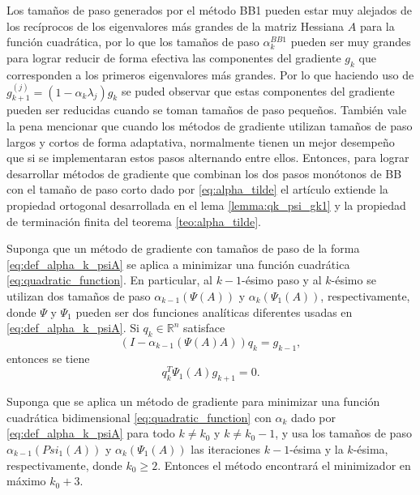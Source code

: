 Los tamaños de paso generados por el método BB1 pueden estar muy alejados de los recíprocos de los eigenvalores más grandes de la matriz Hessiana $A$ para la función cuadrática, por lo que los tamaños de paso $\alpha_k^{BB1}$ pueden ser muy grandes para lograr reducir de forma efectiva las componentes  del gradiente $g_k$ que corresponden a los primeros eigenvalores más grandes. Por lo que haciendo uso de $g_{k+1}^{(j)} = (1-\alpha_k\lambda_j)g_k$ se puded observar que estas componentes del gradiente pueden ser reducidas cuando se toman tamaños de paso pequeños. También vale la pena mencionar que cuando los métodos de gradiente utilizan tamaños de paso largos y cortos de forma adaptativa, normalmente tienen un mejor desempeño que si se implementaran estos pasos alternando entre ellos. Entonces, para lograr desarrollar métodos de gradiente que combinan los dos pasos monótonos de BB con el tamaño de paso corto dado por \ref{eq:alpha_tilde} el artículo extiende la propiedad ortogonal desarrollada en el lema \ref{lemma:qk_psi_gk1} y la propiedad de terminación finita del teorema \ref{teo:alpha_tilde}.

\begin{lema}
    Suponga que un método de gradiente con tamaños de paso de la forma \ref{eq:def_alpha_k_psiA} se aplica a minimizar una función cuadrática \ref{eq:quadratic_function}. En particular, al $k-1$-ésimo paso y al $k$-ésimo se utilizan dos tamaños de paso $\alpha_{k-1}(\Psi(A))$ y $\alpha_k(\Psi_1(A))$, respectivamente, donde $\Psi$ y $\Psi_1$ pueden ser dos funciones analíticas diferentes usadas en \ref{eq:def_alpha_k_psiA}. Si $q_k\in\mathbb{R}^n$ satisface
    \begin{equation}
        (I-\alpha_{k-1}(\Psi(A)A))q_k = g_{k-1},
    \end{equation}
    entonces se tiene
    \begin{equation}
        q_k^T\Psi_1(A)g_{k+1} = 0.
    \end{equation}
\end{lema}

\begin{teor}
    Suponga que se aplica un método de gradiente para minimizar una función cuadrática bidimensional \ref{eq:quadratic_function} con $\alpha_k$ dado por \ref{eq:def_alpha_k_psiA} para todo $k\neq k_0$ y $k\neq k_0-1$, y usa los tamaños de paso $\alpha_{k-1}(Psi_1(A))$ y $\alpha_k(\Psi_1(A))$ las iteraciones $k-1$-ésima y la $k$-ésima, respectivamente, donde $k_0\geq 2$. Entonces el método encontrará el minimizador en máximo $k_0+3$.
\end{teor}

